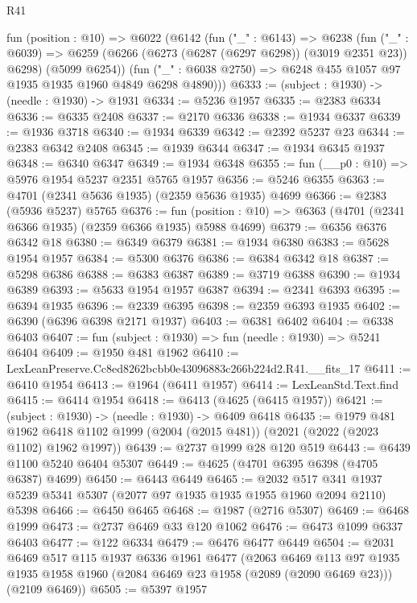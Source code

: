 \begin{lexlean}{R41}
\begin{coremodule}
  fun (position : @10) =>
  @6022
    (@6142
      (fun ("_" : @6143) =>
      @6238
        (fun ("_" : @6039) =>
        @6259 (@6266 (@6273 (@6287 (@6297 @6298)) (@3019 @2351 @23)) @6298) (@5099 @6254))
        (fun ("_" : @6038 @2750) => @6248 @455 @1057 @97 @1935 @1935 @1960 @4849 @6298 @4890)))
@6333 := (subject : @1930) -> (needle : @1930) -> @1931
@6334 := @5236 @1957
@6335 := @2383 @6334
@6336 := @6335 @2408
@6337 := @2170 @6336
@6338 := @1934 @6337
@6339 := @1936 @3718
@6340 := @1934 @6339
@6342 := @2392 @5237 @23
@6344 := @2383 @6342 @2408
@6345 := @1939 @6344
@6347 := @1934 @6345 @1937
@6348 := @6340 @6347
@6349 := @1934 @6348
@6355 := fun (__p0 : @10) => @5976 @1954 @5237 @2351 @5765 @1957
@6356 := @5246 @6355
@6363 := @4701 (@2341 @5636 @1935) (@2359 @5636 @1935) @4699
@6366 := @2383 (@5936 @5237) @5765
@6376 := fun (position : @10) => @6363 (@4701 (@2341 @6366 @1935) (@2359 @6366 @1935) @5988 @4699)
@6379 := @6356 @6376 @6342 @18
@6380 := @6349 @6379
@6381 := @1934 @6380
@6383 := @5628 @1954 @1957
@6384 := @5300 @6376
@6386 := @6384 @6342 @18
@6387 := @5298 @6386
@6388 := @6383 @6387
@6389 := @3719 @6388
@6390 := @1934 @6389
@6393 := @5633 @1954 @1957 @6387
@6394 := @2341 @6393
@6395 := @6394 @1935
@6396 := @2339 @6395
@6398 := @2359 @6393 @1935
@6402 := @6390 (@6396 @6398 @2171 @1937)
@6403 := @6381 @6402
@6404 := @6338 @6403
@6407 := fun (subject : @1930) => fun (needle : @1930) => @5241 @6404
@6409 := @1950 @481 @1962
@6410 := LexLeanPreserve.Cc8ed8262bcbb0e43096883c266b224d2.R41.__fits_17
@6411 := @6410 @1954
@6413 := @1964 (@6411 @1957)
@6414 := LexLeanStd.Text.find
@6415 := @6414 @1954
@6418 := @6413 (@4625 (@6415 @1957))
@6421 := (subject : @1930) -> (needle : @1930) -> @6409 @6418
@6435 := @1979
    @481
    @1962
    @6418
    @1102
    @1999
    (@2004 (@2015 @481))
    (@2021 (@2022 (@2023 @1102) @1962 @1997))
@6439 := @2737 @1999 @28 @120 @519
@6443 := @6439 @1100 @5240 @6404 @5307
@6449 := @4625 (@4701 @6395 @6398 (@4705 @6387) @4699)
@6450 := @6443 @6449
@6465 := @2032
    @517
    @341
    @1937
    @5239
    @5341
    @5307
    (@2077 @97 @1935 @1935 @1955 @1960 @2094 @2110)
    @5398
@6466 := @6450 @6465
@6468 := @1987 (@2716 @5307)
@6469 := @6468 @1999
@6473 := @2737 @6469 @33 @120 @1062
@6476 := @6473 @1099 @6337 @6403
@6477 := @122 @6334
@6479 := @6476 @6477 @6449
@6504 := @2031
    @6469
    @517
    @115
    @1937
    @6336
    @1961
    @6477
    (@2063
      @6469
      @113
      @97
      @1935
      @1935
      @1958
      @1960
      (@2084 @6469 @23 @1958 (@2089 (@2090 @6469 @23)))
      (@2109 @6469))
@6505 := @5397 @1957

\end{coremodule}
\end{lexlean}
